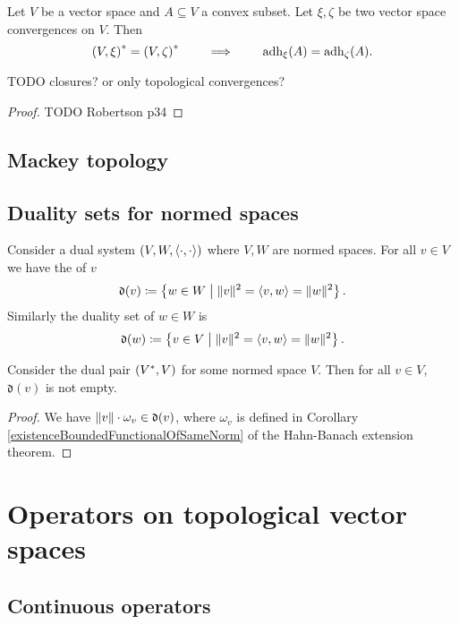 \begin{proposition}
Let $V$ be a vector space and $A\subseteq V$ a convex subset. Let $\xi,\zeta$ be two vector space convergences on $V$. Then
\[ \left( V,\xi \right)^* = \left( V,\zeta \right)^* \qquad\implies\qquad \operatorname{adh}_\xi(A) = \operatorname{adh}_\zeta(A). \]
\end{proposition}
TODO closures? or only topological convergences? 
\begin{proof}
TODO Robertson p34
\end{proof}


\subsection{Mackey topology}

\begin{theorem}
\end{theorem}

\subsection{Duality sets for normed spaces}
\begin{definition}
Consider a dual system $\left( V, W, \left\langle \cdot,\cdot \right\rangle \right)$ where $V,W$ are normed spaces. For all $v\in V$ we have the  of $v$
\[ \mathfrak{d}(v) \coloneqq \left\{ w\in W \;\middle|\; \lVert v\rVert^2 = \left\langle v,w \right\rangle = \lVert w\rVert^2 \right\}. \]
Similarly the duality set of $w\in W$ is
\[ \mathfrak{d}(w) \coloneqq \left\{ v\in V \;\middle|\; \lVert v\rVert^2 = \left\langle v,w \right\rangle = \lVert w\rVert^2 \right\}. \]
\end{definition}

\begin{proposition}
Consider the dual pair $\left( V^*, V \right)$ for some normed space $V$. Then for all $v\in V$, $\mathfrak{d}(v)$ is not empty.
\end{proposition}
\begin{proof}
We have $\lVert v\rVert\cdot \omega_v\in \mathfrak{d}(v)$, where $\omega_v$ is defined in Corollary \ref{existenceBoundedFunctionalOfSameNorm} of the Hahn-Banach extension theorem.
\end{proof}

\section{Operators on topological vector spaces}

\subsection{Continuous operators}
